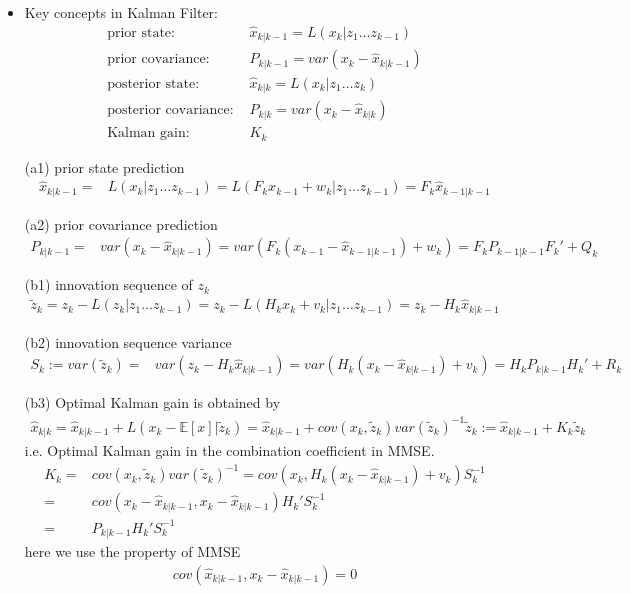 \begin{itemize}[topsep=2pt,itemsep=0pt]
    \item Key concepts in Kalman Filter:
    \begin{align}
        \text{prior state: }&\hat{x}_{k|k-1}=L(x_k|z_1\ldots z_{k-1}) \\
        \text{prior covariance: }&P_{k|k-1}=var\left(x_k-\hat{x}_{k|k-1}\right)\\
        \text{posterior state: }&\hat{x}_{k|k}=L(x_k|z_1\ldots z_{k}) \\
        \text{posterior covariance: }&P_{k|k}=var\left(x_k-\hat{x}_{k|k}\right)\\
        \text{Kalman gain: }&K_k
    \end{align}
    \item[(a1)] prior state prediction
    \begin{align}
        \hat{x}_{k|k-1}=&L(x_k|z_1\ldots z_{k-1})=L(F_kx_{k-1}+w_k|z_1\ldots z_{k-1})=F_k\hat{x}_{k-1|k-1} 
    \end{align}
    \item[(a2)] prior covariance prediction
    \begin{align}
         P_{k|k-1}=&var\left(x_{k}-\hat{x}_{k|k-1}\right)=var\left(F_k(x_{k-1}-\hat{x}_{k-1|k-1})+w_k\right)=F_kP_{k-1|k-1}F_k'+Q_k
    \end{align}
    \item[(b1)] innovation sequence of $ z_k $
    \begin{align}
        \tilde{z}_k=z_k-L(z_k|z_1\ldots z_{k-1})=z_k-L(H_kx_k+v_k|z_1\ldots z_{k-1} )=z_k-H_k\hat{x}_{k|k-1}
    \end{align}
    \item[(b2)] innovation sequence variance
    \begin{align}
        S_k:=var(\tilde{z}_k)=&var\left( z_k-H_k\hat{x}_{k|k-1} \right)=var\left(H_k(x_k-\hat{x}_{k|k-1})+v_k\right)=H_kP_{k|k-1}H_k'+R_k
    \end{align}
    \item[(b3)] Optimal Kalman gain is obtained by
    \begin{align}
        \hat{x}_{k|k}=\hat{x}_{k|k-1}+L(x_k-\mathbb{E}\left[ x \right]|\tilde{z}_k )=\hat{x}_{k|k-1}+cov(x_k,\tilde{z}_k)var(\tilde{z}_k)^{-1}\tilde{z}_k :=\hat{x}_{k|k-1}+K_k\tilde{z}_k
    \end{align}
    i.e. Optimal Kalman gain in the combination coefficient in MMSE.
    \begin{align}
        K_k=& cov(x_k,\tilde{z}_k)var(\tilde{z}_k)^{-1}=cov(x_k,H_k(x_k-\hat{x}_{k|k-1})+v_k)S_k^{-1}\\
        =&cov(x_k-\hat{x}_{k|k-1},x_k-\hat{x}_{k|k-1})H_k'S_k^{-1}\\
        =&P_{k|k-1}H_k'S_k^{-1}
    \end{align}
    here we use the property of MMSE
    \begin{align}
        cov(\hat{x}_{k|k-1},x_k-\hat{x}_{k|k-1})=0 
    \end{align}
    

\end{itemize}

